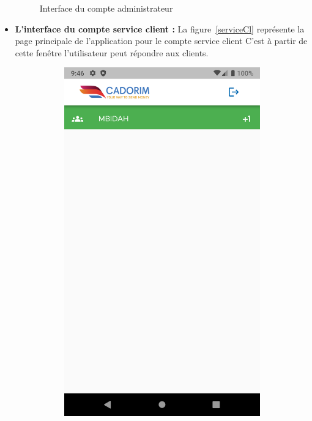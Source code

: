 \begin{itemize}[label=$\ast$]
\begin{figure}
	\caption{Interface du compte administrateur
}
\label{Home}
\end{figure}
\newpage
\item \textbf{L’interface du compte service client
	:} 
La figure~\ref{serviceCl} représente la page principale de l’application pour le compte service client C’est à partir de cette fenêtre l'utilisateur peut répondre aux clients.
\begin{figure}
	\centering
\begin{subfigure}{0.3\textwidth}
	\includegraphics[width=\hsize, valign=m ]{./Template LaTeX/Images/From_emu/no_vue.png}

\end{subfigure}
\end{figure}
\end{itemize}
